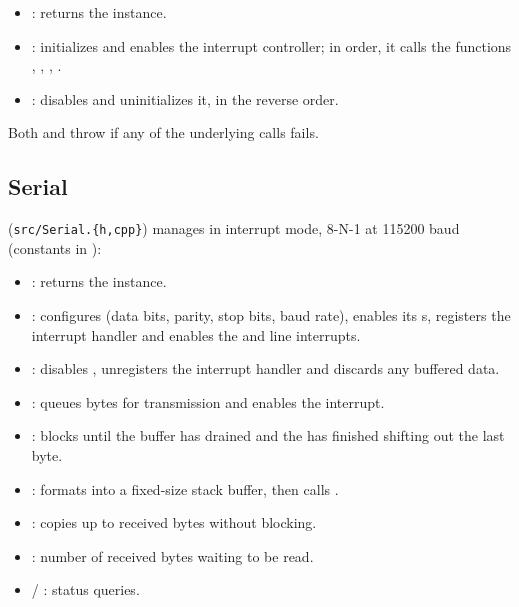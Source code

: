 \begin{itemize}
    \item {}: returns the  instance.
    \item {}: initializes and enables the interrupt controller; in order, it calls the   functions , , , .
    \item {}: disables and uninitializes it, in the reverse order.
\end{itemize}

Both  and  throw  if any of the underlying calls fails.

\subsection{Serial}
\label{subsec:fpgasteel-hello-serial}

 (\lstinline[style=inlineFsRepo]!src/Serial.{h,cpp}!) manages  in interrupt mode, 8-N-1 at 115200 baud (constants in ):

\begin{itemize}
    \item {}: returns the  instance.
    \item {}: configures  (data bits, parity, stop bits, baud rate), enables its s, registers the  interrupt handler and enables the  and line interrupts.
    \item {}: disables , unregisters the interrupt handler and discards any buffered data.
    \item {}: queues bytes for transmission and enables the  interrupt.
    \item {}: blocks until the  buffer has drained and the  has finished shifting out the last byte.
    \item {}: formats into a fixed-size stack buffer, then calls .
    \item {}: copies up to  received bytes without blocking.
    \item {}: number of received bytes waiting to be read.
    \item {} / : status queries.
\end{itemize}

